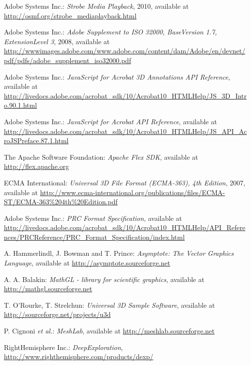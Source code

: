 \documentclass[a4paper]{article}
\begin{document}
\begin{thebibliography}{9}
   Adobe Systems Inc.: \emph{Strobe Media Playback}, 2010, available at \url{http://osmf.org/strobe_mediaplayback.html}

   Adobe Systems Inc.: \emph{Adobe Supplement to ISO 32000, BaseVersion 1.7, ExtensionLevel 3}, 2008, available at \url{http://wwwimages.adobe.com/www.adobe.com/content/dam/Adobe/en/devnet/pdf/pdfs/adobe_supplement_iso32000.pdf}

   Adobe Systems Inc.: \emph{JavaScript for Acrobat 3D Annotations API Ref\-er\-ence}, available at \url{http://livedocs.adobe.com/acrobat_sdk/10/Acrobat10_HTMLHelp/JS_3D_Intro.90.1.html}

   Adobe Systems Inc.: \emph{JavaScript for Acrobat API Reference}, available at \url{http://livedocs.adobe.com/acrobat_sdk/10/Acrobat10_HTMLHelp/JS_API_AcroJSPreface.87.1.html}

   The Apache Software Foundation: \emph{Apache Flex SDK}, available at \url{http://flex.apache.org}

   ECMA International: \emph{Universal 3D File Format (ECMA-363), 4th Edition}, 2007, available at \url{http://www.ecma-international.org/publications/files/ECMA-ST/ECMA-363\%204th\%20Edition.pdf}

   Adobe Systems Inc.: \emph{PRC Format Specification}, available at \url{http://livedocs.adobe.com/acrobat_sdk/10/Acrobat10_HTMLHelp/API_References/PRCReference/PRC_Format_Specification/index.html}

   A. Hammerlindl, J. Bowman and T. Prince: \emph{Asymptote: The Vector Graphics Language}, available at \url{http://asymptote.sourceforge.net}

   A. A. Balakin: \emph{MathGL - library for scientific graphics}, available at \url{http://mathgl.sourceforge.net}

   T. O'Rourke, T. Strelchun: \emph{Universal 3D Sample Software}, available at \url{http://sourceforge.net/projects/u3d}

   P. Cignoni \emph{et al.}: \emph{MeshLab}, available at \url{http://meshlab.sourceforge.net}

   RightHemisphere Inc.: \emph{DeepExploration}, \url{http://www.righthemisphere.com/products/dexp/}
\end{thebibliography}
\end{document}
